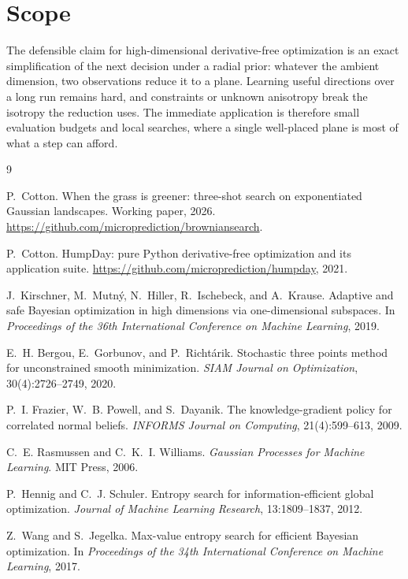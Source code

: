 \documentclass[11pt]{article}
\theoremstyle{itheads}
\begin{document}
\section{Scope}

The defensible claim for high-dimensional derivative-free optimization is
an exact simplification of the next decision under a radial prior:
whatever the ambient dimension, two observations reduce it to a plane.
Learning useful directions over a long run remains hard, and constraints
or unknown anisotropy break the isotropy the reduction uses. The
immediate application is therefore small evaluation budgets and local
searches, where a single well-placed plane is most of what a step can
afford.

\begin{thebibliography}{9}

P.~Cotton.
When the grass is greener: three-shot search on exponentiated Gaussian
landscapes.
Working paper, 2026.
\url{https://github.com/microprediction/browniansearch}.

P.~Cotton.
HumpDay: pure Python derivative-free optimization and its application
suite.
\url{https://github.com/microprediction/humpday}, 2021.

J.~Kirschner, M.~Mutn\'y, N.~Hiller, R.~Ischebeck, and A.~Krause.
Adaptive and safe Bayesian optimization in high dimensions via
one-dimensional subspaces.
In \emph{Proceedings of the 36th International Conference on Machine
Learning}, 2019.

E.~H. Bergou, E.~Gorbunov, and P.~Richt\'arik.
Stochastic three points method for unconstrained smooth minimization.
\emph{SIAM Journal on Optimization}, 30(4):2726--2749, 2020.

P.~I. Frazier, W.~B. Powell, and S.~Dayanik.
The knowledge-gradient policy for correlated normal beliefs.
\emph{INFORMS Journal on Computing}, 21(4):599--613, 2009.

C.~E. Rasmussen and C.~K.~I. Williams.
\emph{Gaussian Processes for Machine Learning}.
MIT Press, 2006.

P.~Hennig and C.~J. Schuler.
Entropy search for information-efficient global optimization.
\emph{Journal of Machine Learning Research}, 13:1809--1837, 2012.

Z.~Wang and S.~Jegelka.
Max-value entropy search for efficient Bayesian optimization.
In \emph{Proceedings of the 34th International Conference on Machine
Learning}, 2017.

\end{thebibliography}
\end{document}
